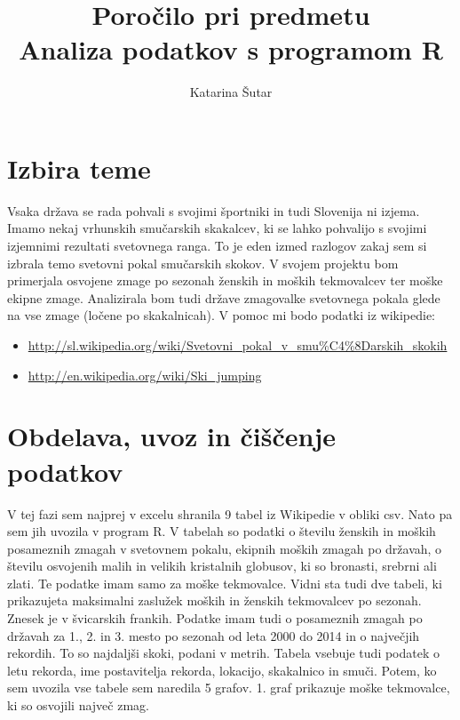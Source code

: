 \documentclass[11pt,a4paper]{article}
\begin{document}
\title{Poročilo pri predmetu \\
Analiza podatkov s programom R}
\author{Katarina Šutar}
\maketitle

\section{Izbira teme}

Vsaka država se rada pohvali s svojimi športniki in tudi Slovenija ni izjema. Imamo nekaj vrhunskih smučarskih skakalcev, ki se lahko pohvalijo s svojimi izjemnimi rezultati svetovnega ranga. To je eden izmed razlogov zakaj sem si izbrala temo svetovni pokal smučarskih skokov. V svojem projektu bom primerjala osvojene zmage po sezonah ženskih in moških tekmovalcev ter moške ekipne zmage. Analizirala bom tudi države zmagovalke svetovnega pokala glede na vse zmage (ločene po skakalnicah). V pomoc mi bodo podatki iz wikipedie:
\begin{itemize}
\item \url{http://sl.wikipedia.org/wiki/Svetovni_pokal_v_smu%C4%8Darskih_skokih}
\item \url{http://en.wikipedia.org/wiki/Ski_jumping}
\end{itemize}


\section{Obdelava, uvoz in čiščenje podatkov}

V tej fazi sem najprej v excelu shranila 9 tabel iz Wikipedie v obliki csv. Nato pa sem jih uvozila v program R. V tabelah so podatki o številu ženskih in moških posameznih zmagah v svetovnem pokalu, ekipnih moških zmagah po državah, o številu osvojenih malih in velikih kristalnih globusov, ki so bronasti, srebrni ali zlati. Te podatke imam samo za moške tekmovalce. Vidni sta tudi dve tabeli, ki prikazujeta maksimalni zaslužek moških in ženskih tekmovalcev po sezonah. Znesek je v švicarskih frankih. Podatke imam tudi o posameznih zmagah po državah za 1., 2. in 3. mesto po sezonah od leta 2000 do 2014 in o največjih rekordih. To so najdaljši skoki, podani v metrih. Tabela vsebuje tudi podatek o letu rekorda, ime postavitelja rekorda, lokacijo, skakalnico in smuči. Potem, ko sem uvozila vse tabele sem naredila 5 grafov. 
1. graf prikazuje moške tekmovalce, ki so osvojili največ zmag.
\end{document}

